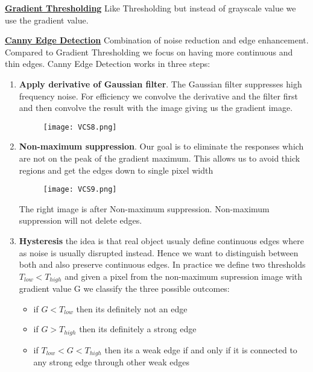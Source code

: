 \documentclass[8pt]{extreport}
\begin{document}
\underline{\textbf{Gradient Thresholding}} Like Thresholding but instead of grayscale value we use the gradient value.

\underline{\textbf{Canny Edge Detection}} Combination of noise reduction and edge enhancement. Compared to Gradient Thresholding we focus on having more continuous and thin edges. Canny Edge Detection works in three steps:
\begin{enumerate}
\item \textbf{Apply derivative of Gaussian filter}. The Gaussian filter suppresses high frequency noise. For efficiency we convolve the derivative and the filter first and then convolve the result with the image giving us the gradient image.
\begin{figure}[H]
\centering
\texttt{[image: VCS8.png]}
\end{figure}
\item \textbf{ Non-maximum suppression}. Our goal is to eliminate the responses which are not on the peak of the gradient maximum. This allows us to avoid thick regions and get the edges down to single pixel width
\begin{figure}[H]
\centering
\texttt{[image: VCS9.png]}
\end{figure}
The right image is after Non-maximum suppression. Non-maximum suppression will not delete edges.
\item \textbf{Hysteresis } the idea is that real object usualy define continuous edges where as noise is usually disrupted instead. Hence we want to distinguish between both and also preserve continuous edges. In practice we define two thresholds $T_{low} < T_{high}$ and given a pixel from the non-maximum supression image with gradient value G we classify the three possible outcomes:
\begin{itemize}
\item if $G < T_{low}$ then its definitely not an edge
\item if $G > T_{high}$ then its definitely a strong edge
\item if $T_{low} < G < T_{high}$ then its a weak edge if and only if it is connected to any strong edge through other weak edges
\end{itemize}
\end{enumerate}
\end{document}
